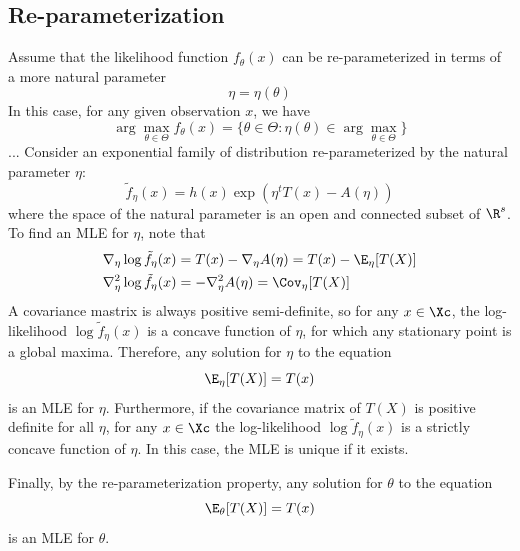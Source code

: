 \subsection{Re-parameterization}
Assume that the likelihood function $f_\theta(x)$ can be re-parameterized in terms of a more natural parameter
\[
    \eta = \eta(\theta)
\]
In this case, for any given observation $x$, we have
\[
    \arg\max_{\theta\in\Theta} f_\theta(x) = \{ \theta \in \Theta : \eta(\theta) \in \arg\max_{\theta\in\Theta} \}
\] ... %
Consider an exponential family of distribution re-parameterized by the natural parameter $\eta$:
\[
    \tilde{f}_\eta(x) = h(x) \exp(\eta^t T(x) - A(\eta))
\]
where the space of the natural parameter is an open and connected subset of $\R^s$. To find an MLE for $\eta$, note that
\begin{align*}
    \nabla_\eta \log\tilde{f}_\eta(x)    & = T(x) - \nabla_\eta A(\eta) = T(x) - \E_\eta[T(X)] \\
    \nabla_\eta^2 \log \tilde{f}_\eta(x) & = -\nabla_\eta^2 A(\eta) = \Cov_\eta[T(X)]
\end{align*}
A covariance mastrix is always positive semi-definite, so for any $x\in\Xc$, the log-likelihood $\log\tilde{f}_\eta(x)$ is a concave function of $\eta$, for which any stationary point is a global maxima. Therefore,
any solution for $\eta$ to the equation
\[
    \E_\eta[T(X)] = T(x)
\]
is an MLE for $\eta$. Furthermore, if the covariance matrix of $T(X)$ is positive definite for all
$\eta$, for any $x \in \Xc$ the log-likelihood $\log\tilde{f}_\eta(x)$ is a strictly concave function of $\eta$. In this case, the MLE is unique if it exists.

Finally, by the re-parameterization property, any solution for $\theta$ to the equation
\[
    \E_\theta[T(X)] = T(x)
\]
is an MLE for $\theta$.
